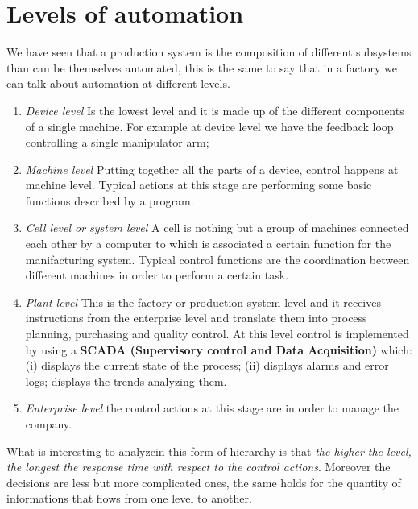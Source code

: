 \section{Levels of automation}
We have seen that a production system is the composition of different subsystems than can be themselves automated, this is the same to say that in a factory we can talk about automation at different levels. 
\begin{enumerate}
    \itemsep-0.3em
    \item \emph{Device level} Is the lowest level and it is made up of the different components of a single machine. For example at device level we have the feedback loop controlling a single manipulator arm;
    \item \emph{Machine level} Putting together all the parts of a device, control happens at machine level. Typical actions at this stage are performing some basic functions described by a program. 
    \item \emph{Cell level or system level} A cell is nothing but a group of machines connected each other by a computer to which is associated a certain function for the manifacturing system. Typical control functions are the coordination between different machines in order to perform a certain task.
    \item \emph{Plant level} This is the factory or production system level and it receives instructions from the enterprise level and translate them into process planning, purchasing and quality control. At this level control is implemented by using a \textbf{SCADA (Supervisory control and Data Acquisition)} which: (i) displays the current state of the process; (ii) displays alarms and error logs; displays the trends analyzing them.
    \item \emph{Enterprise level} the control actions at this stage are in order to manage the company.
\end{enumerate}

What is interesting to analyzein this form of hierarchy is that \textit{the higher the level, the longest the response time with respect to the control actions}. Moreover the decisions are less but more complicated ones, the same holds for the quantity of informations that flows from one level to another.


